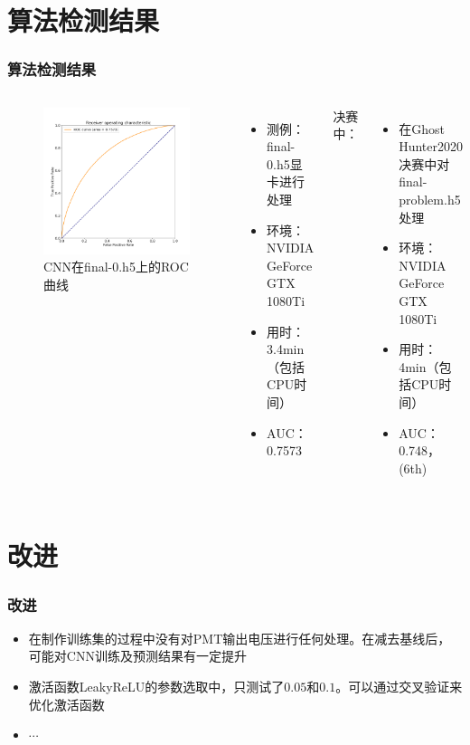 \documentclass{beamer}
\begin{document}
\section{算法检测结果}
\begin{frame}
\frametitle{算法检测结果}
\begin{columns}
\begin{figure}[H]
    \centering
    \includegraphics[width=1.0\linewidth]{ROC.png}
    \caption{CNN在final-0.h5上的ROC曲线}
\end{figure}
\begin{itemize}
    \item 测例：final-0.h5显卡进行处理
    \item 环境：NVIDIA GeForce GTX 1080Ti
    \item 用时：3.4min（包括CPU时间）
    \item AUC：0.7573
\end{itemize}
决赛中：
\begin{itemize}
    \item 在Ghost Hunter2020决赛中对final-problem.h5处理
    \item 环境：NVIDIA GeForce GTX 1080Ti
    \item 用时：4min（包括CPU时间）
    \item AUC：0.748，(6th)
\end{itemize}
\end{columns}
\end{frame}

\section{改进}
\begin{frame}
\frametitle{改进}
\begin{itemize}
    \item 在制作训练集的过程中没有对PMT输出电压进行任何处理。在减去基线后，可能对CNN训练及预测结果有一定提升
    \item 激活函数LeakyReLU的参数选取中，只测试了$0.05$和$0.1$。可以通过交叉验证来优化激活函数
    \item $\cdots$
\end{itemize}
\end{frame}
\end{document}
